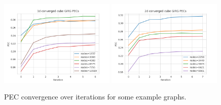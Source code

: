 

\begin{figure}
  \centering
  \includegraphics[width=0.49\textwidth]{figures/mcmc_ordered_1d_pec_convergence.png}
  \includegraphics[width=0.49\textwidth]{figures/mcmc_ordered_2d_pec_convergence.png}
  \caption{PEC convergence over iterations for some example graphs.}
\end{figure}


